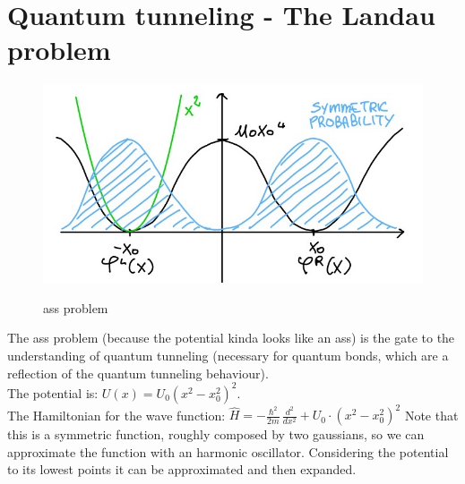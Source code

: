 \section{Quantum tunneling - The Landau problem}
\begin{figure}[htbp!]
	\centering
	\includegraphics[scale=0.30]{img_2.jpg}
	\label{fig:ass}
	\caption{ass problem}
\end{figure}
The ass problem (because the potential kinda looks like an ass) is the gate to the understanding of quantum tunneling (necessary for quantum bonds, which are a reflection of the quantum tunneling behaviour). \\
The potential is: $U(x)=U_0(x^2-x_0^2)^2$.\\

The Hamiltonian for the wave function: $\hat{H}=-\frac{\hbar^2}{2m}\,\frac{d^2}{dx^2}+U_0\cdot(x^2-x_0^2)^2$
Note that this is a symmetric function, roughly composed by two gaussians, so we can approximate the function with an harmonic oscillator. Considering the potential to its lowest points it can be approximated and then expanded. \\

